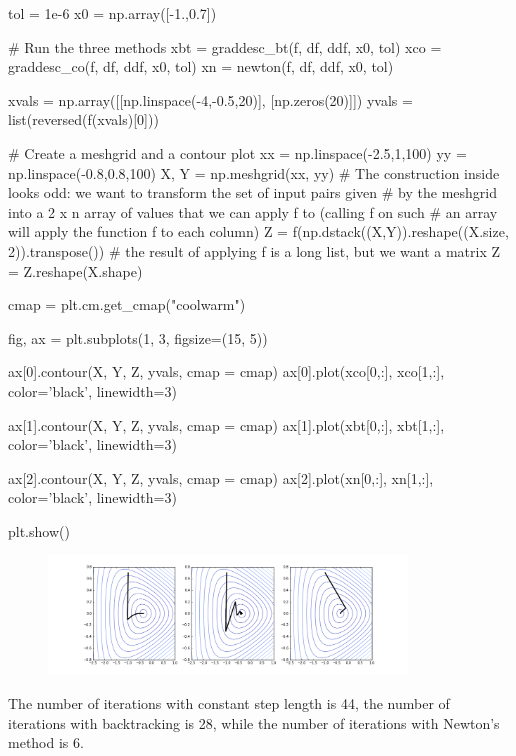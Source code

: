 \documentclass{article}
\begin{document}
\begin{ipythonnb}
tol = 1e-6
x0 = np.array([-1.,0.7])

# Run the three methods
xbt = graddesc_bt(f, df, ddf, x0, tol)
xco = graddesc_co(f, df, ddf, x0, tol)
xn = newton(f, df, ddf, x0, tol)
\end{ipythonnb}

\begin{ipythonnb}
xvals = np.array([[np.linspace(-4,-0.5,20)], [np.zeros(20)]])
yvals = list(reversed(f(xvals)[0]))

# Create a meshgrid and a contour plot
xx = np.linspace(-2.5,1,100)
yy = np.linspace(-0.8,0.8,100)
X, Y = np.meshgrid(xx, yy)
# The construction inside looks odd: we want to transform the set of input pairs given
# by the meshgrid into a 2 x n array of values that we can apply f to (calling f on such
# an array will apply the function f to each column)
Z = f(np.dstack((X,Y)).reshape((X.size, 2)).transpose())
# the result of applying f is a long list, but we want a matrix
Z = Z.reshape(X.shape)

cmap = plt.cm.get_cmap("coolwarm")

fig, ax = plt.subplots(1, 3, figsize=(15, 5))

ax[0].contour(X, Y, Z, yvals, cmap = cmap)
ax[0].plot(xco[0,:], xco[1,:], color='black', linewidth=3)

ax[1].contour(X, Y, Z, yvals, cmap = cmap)
ax[1].plot(xbt[0,:], xbt[1,:], color='black', linewidth=3)

ax[2].contour(X, Y, Z, yvals, cmap = cmap)
ax[2].plot(xn[0,:], xn[1,:], color='black', linewidth=3)

plt.show()
\end{ipythonnb}

\begin{figure}[h!]
 \centering
 \includegraphics[width=0.85\textwidth]{images/threemethods.png}
\end{figure}

The number of iterations with constant step length is 44, the number of iterations with backtracking is 28, while the number of iterations with Newton's method is 6.
\end{document}
